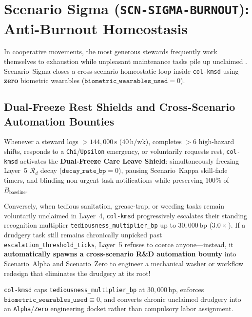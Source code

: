 \section{Scenario Sigma (\texttt{SCN-SIGMA-BURNOUT}): Anti-Burnout Homeostasis}
\label{sec:wavea-sigma}

In cooperative movements, the most generous stewards frequently work themselves to exhaustion while
unpleasant maintenance tasks pile up unclaimed \parencite{han2015,cannon1932}. Scenario~Sigma closes
a cross-scenario homeostatic loop inside \texttt{col-kmsd} using \textbf{zero} biometric wearables
($\mathtt{biometric\_wearables\_used} = 0$).

\subsection{Dual-Freeze Rest Shields and Cross-Scenario Automation Bounties}

Whenever a steward logs $> 144{,}000\,\mathrm{s}$ ($40\,\mathrm{h/wk}$), completes $> 6$ high-hazard
shifts, responds to a \texttt{Chi}/\texttt{Upsilon} emergency, or voluntarily requests rest,
\texttt{col-kmsd} activates the \textbf{Dual-Freeze Care Leave Shield}: simultaneously freezing Layer~5
$\mathcal{R}_d$ decay ($\mathtt{decay\_rate\_bp} = 0$), pausing Scenario~Kappa skill-fade timers,
and blinding non-urgent task notifications while preserving $100\%$ of $B_{\mathrm{baseline}}$.

Conversely, when tedious sanitation, grease-trap, or weeding tasks remain voluntarily unclaimed in
Layer~4, \texttt{col-kmsd} progressively escalates their standing recognition multiplier
\texttt{tediousness\_multiplier\_bp} up to $30{,}000\,\mathrm{bp}$ ($3.0\times$). If a drudgery task
still remains chronically unpicked past \texttt{escalation\_threshold\_ticks}, Layer~5 refuses to
coerce anyone---instead, it \textbf{automatically spawns a cross-scenario R\&D automation bounty} into
Scenario~Alpha and Scenario~Zero to engineer a mechanical washer or workflow redesign that eliminates
the drudgery at its root!

\begin{invariant}
\label{inv:wavea-sigma-bounty}
\texttt{col-kmsd} caps \texttt{tediousness\_multiplier\_bp} at $30{,}000\,\mathrm{bp}$, enforces
$\mathtt{biometric\_wearables\_used} \equiv 0$, and converts chronic unclaimed drudgery into an
\texttt{Alpha}/\texttt{Zero} engineering docket rather than compulsory labor assignment.
\end{invariant}

